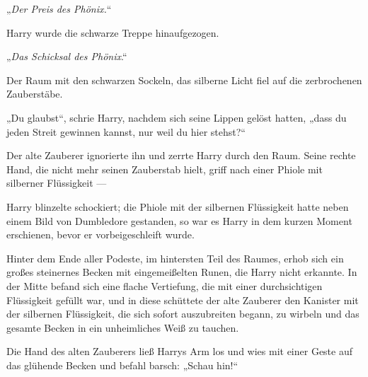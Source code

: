 „\emph{Der Preis des Phönix.}“

Harry wurde die schwarze Treppe hinaufgezogen.

„\emph{Das Schicksal des Phönix}.“

Der Raum mit den schwarzen Sockeln, das silberne Licht fiel auf die zerbrochenen Zauberstäbe.

„Du glaubst“, schrie Harry, nachdem sich seine Lippen gelöst hatten, „dass du jeden Streit gewinnen kannst, nur weil du hier stehst?“

Der alte Zauberer ignorierte ihn und zerrte Harry durch den Raum. Seine rechte Hand, die nicht mehr seinen Zauberstab hielt, griff nach einer Phiole mit silberner Flüssigkeit —

Harry blinzelte schockiert; die Phiole mit der silbernen Flüssigkeit hatte neben einem Bild von Dumbledore gestanden, so war es Harry in dem kurzen Moment erschienen, bevor er vorbeigeschleift wurde.

Hinter dem Ende aller Podeste, im hintersten Teil des Raumes, erhob sich ein großes steinernes Becken mit eingemeißelten Runen, die Harry nicht erkannte. In der Mitte befand sich eine flache Vertiefung, die mit einer durchsichtigen Flüssigkeit gefüllt war, und in diese schüttete der alte Zauberer den Kanister mit der silbernen Flüssigkeit, die sich sofort auszubreiten begann, zu wirbeln und das gesamte Becken in ein unheimliches Weiß zu tauchen.

Die Hand des alten Zauberers ließ Harrys Arm los und wies mit einer Geste auf das glühende Becken und befahl barsch:
„Schau hin!“

